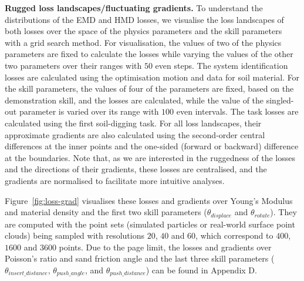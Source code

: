 \documentclass[letterpaper, 10 pt, journal, twoside]{ieeetran}
\begin{document}
\textbf{Rugged loss landscapes/fluctuating gradients.} To understand the distributions of the EMD and HMD losses, we visualise the loss landscapes of both losses over the space of the physics parameters and the skill parameters with a grid search method. For visualisation, the values of two of the physics parameters are fixed to calculate the losses while varying the values of the other two parameters over their ranges with $50$ even steps. The system identification losses are calculated using the optimisation motion and data for soil material. For the skill parameters, the values of four of the parameters are fixed, based on the demonstration skill, and the losses are calculated, while the value of the singled-out parameter is varied over its range with $100$ even intervals. The task losses are calculated using the first soil-digging task. For all loss landscapes, their approximate gradients are also calculated using the second-order central differences at the inner points and the one-sided (forward or backward) difference at the boundaries. Note that, as we are interested in the ruggedness of the losses and the directions of their gradients, these losses are centralised, and the gradients are normalised to facilitate more intuitive analyses.

Figure~\ref{fig:loss-grad} visualises these losses and gradients over Young's Modulus and material density and the first two skill parameters ($\theta_{displace}$ and $\theta_{rotate}$). They are computed with the point sets (simulated particles or real-world surface point clouds) being sampled with resolutions $20$, $40$ and $60$, which correspond to $400$, $1600$ and $3600$ points. Due to the page limit, the losses and gradients over Poisson's ratio and sand friction angle and the last three skill parameters ($ \theta_{insert\_distance}$, $\theta_{push\_angle}$, and $\theta_{push\_distance}$) can be found in Appendix D. 
\end{document}

